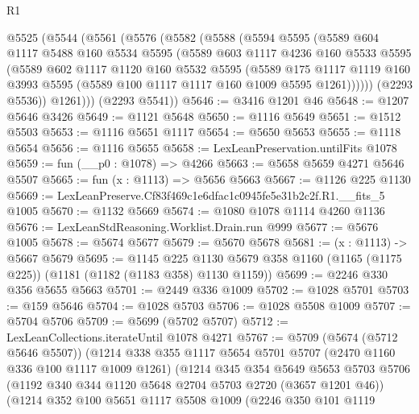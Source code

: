 \begin{lexlean}{R1}
\begin{coremodule}
  @5525
    (@5544
      (@5561
        (@5576
          (@5582
            (@5588
              (@5594
                @5595
                (@5589
                  @604
                  @1117
                  @5488
                  @160
                  @5534
                  @5595
                  (@5589
                    @603
                    @1117
                    @4236
                    @160
                    @5533
                    @5595
                    (@5589
                      @602
                      @1117
                      @1120
                      @160
                      @5532
                      @5595
                      (@5589
                        @175
                        @1117
                        @1119
                        @160
                        @3993
                        @5595
                        (@5589 @100 @1117 @1117 @160 @1009 @5595 @1261))))))
              (@2293 @5536))
            @1261)))
      (@2293 @5541))
@5646 := @3416 @1201 @46
@5648 := @1207 @5646 @3426
@5649 := @1121 @5648
@5650 := @1116 @5649
@5651 := @1512 @5503
@5653 := @1116 @5651 @1117
@5654 := @5650 @5653
@5655 := @1118 @5654
@5656 := @1116 @5655
@5658 := LexLeanPreservation.untilFits @1078
@5659 := fun (__p0 : @1078) => @4266
@5663 := @5658 @5659 @4271 @5646 @5507
@5665 := fun (x : @1113) => @5656 @5663
@5667 := @1126 @225 @1130
@5669 := LexLeanPreserve.Cf83f469c1e6dfac1c0945fe5e31b2c2f.R1.__fits_5 @1005
@5670 := @1132 @5669
@5674 := @1080 @1078 @1114 @4260 @1136
@5676 := LexLeanStdReasoning.Worklist.Drain.run @999
@5677 := @5676 @1005
@5678 := @5674 @5677
@5679 := @5670 @5678
@5681 := (x : @1113) -> @5667 @5679
@5695 := @1145
    @225
    @1130
    @5679
    @358
    @1160
    (@1165 (@1175 @225))
    (@1181 (@1182 (@1183 @358) @1130 @1159))
@5699 := @2246 @330 @356 @5655 @5663
@5701 := @2449 @336 @1009
@5702 := @1028 @5701
@5703 := @159 @5646
@5704 := @1028 @5703
@5706 := @1028 @5508 @1009
@5707 := @5704 @5706
@5709 := @5699 (@5702 @5707)
@5712 := LexLeanCollections.iterateUntil @1078 @4271
@5767 := @5709
    (@5674 (@5712 @5646 @5507))
    (@1214
      @338
      @355
      @1117
      @5654
      @5701
      @5707
      (@2470 @1160 @336 @100 @1117 @1009 @1261)
      (@1214
        @345
        @354
        @5649
        @5653
        @5703
        @5706
        (@1192 @340 @344 @1120 @5648 @2704 @5703 @2720 (@3657 @1201 @46))
        (@1214
          @352
          @100
          @5651
          @1117
          @5508
          @1009
          (@2246
            @350
            @101
            @1119

\end{coremodule}
\end{lexlean}
